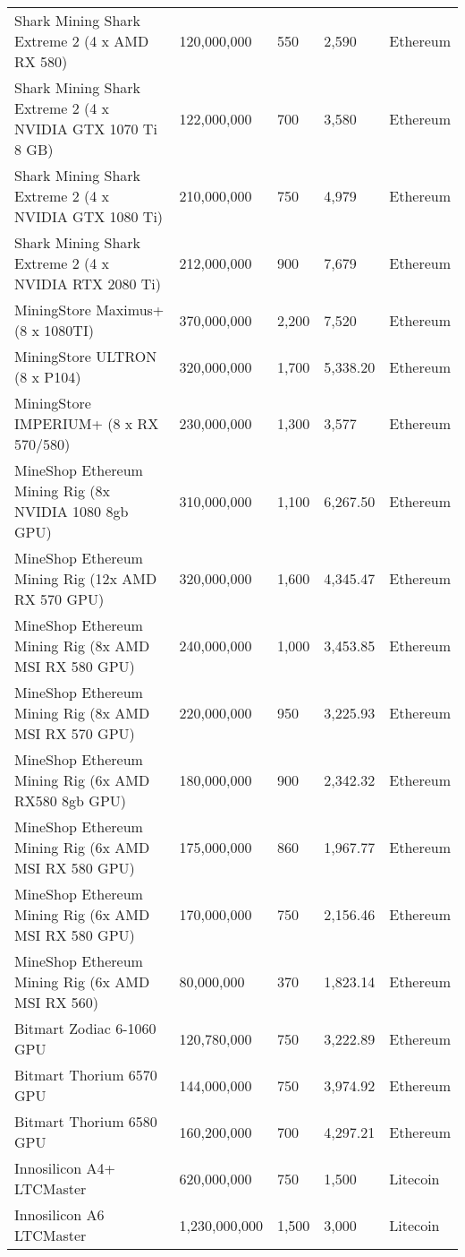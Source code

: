 \begin{longtable}{|p{}|p{}|p{}|p{}|p{}|}
  Shark Mining Shark Extreme 2 (4 x AMD RX 580) & 120,000,000 & 550 & 2,590 & Ethereum \\
  Shark Mining Shark Extreme 2 (4 x NVIDIA GTX 1070 Ti 8 GB) & 122,000,000 & 700 & 3,580 & Ethereum \\
  Shark Mining Shark Extreme 2 (4 x NVIDIA GTX 1080 Ti) & 210,000,000 & 750 & 4,979 & Ethereum \\
  Shark Mining Shark Extreme 2 (4 x NVIDIA RTX 2080 Ti) & 212,000,000 & 900 & 7,679 & Ethereum \\
  MiningStore Maximus+ (8 x 1080TI) & 370,000,000 & 2,200 & 7,520 & Ethereum \\
  MiningStore ULTRON (8 x P104) & 320,000,000 & 1,700 & 5,338.20 & Ethereum \\
  MiningStore IMPERIUM+ (8 x RX 570/580) & 230,000,000 & 1,300 & 3,577 & Ethereum \\
  MineShop Ethereum Mining Rig (8x NVIDIA 1080 8gb GPU) & 310,000,000 & 1,100 & 6,267.50 & Ethereum \\
  MineShop Ethereum Mining Rig (12x AMD RX 570 GPU) & 320,000,000 & 1,600 & 4,345.47 & Ethereum \\
  MineShop Ethereum Mining Rig (8x AMD MSI RX 580 GPU) & 240,000,000 & 1,000 & 3,453.85 & Ethereum \\
  MineShop Ethereum Mining Rig (8x AMD MSI RX 570 GPU) & 220,000,000 & 950 & 3,225.93 & Ethereum \\
  MineShop Ethereum Mining Rig (6x AMD RX580 8gb GPU) & 180,000,000 & 900 & 2,342.32 & Ethereum \\
  MineShop Ethereum Mining Rig (6x AMD MSI RX 580 GPU) & 175,000,000 & 860 & 1,967.77 & Ethereum \\
  MineShop Ethereum Mining Rig (6x AMD MSI RX 580 GPU) & 170,000,000 & 750 & 2,156.46 & Ethereum \\
  MineShop Ethereum Mining Rig (6x AMD MSI RX 560) & 80,000,000 & 370 & 1,823.14 & Ethereum \\
  Bitmart Zodiac 6-1060 GPU & 120,780,000 & 750 & 3,222.89 & Ethereum \\
  Bitmart Thorium 6570 GPU & 144,000,000 & 750 & 3,974.92 & Ethereum \\
  Bitmart Thorium 6580 GPU & 160,200,000 & 700 & 4,297.21 & Ethereum \\
  \hline
  Innosilicon A4+ LTCMaster & 620,000,000 & 750 & 1,500 & Litecoin \\
  Innosilicon A6 LTCMaster & 1,230,000,000 & 1,500 & 3,000 & Litecoin \\

\end{longtable}
